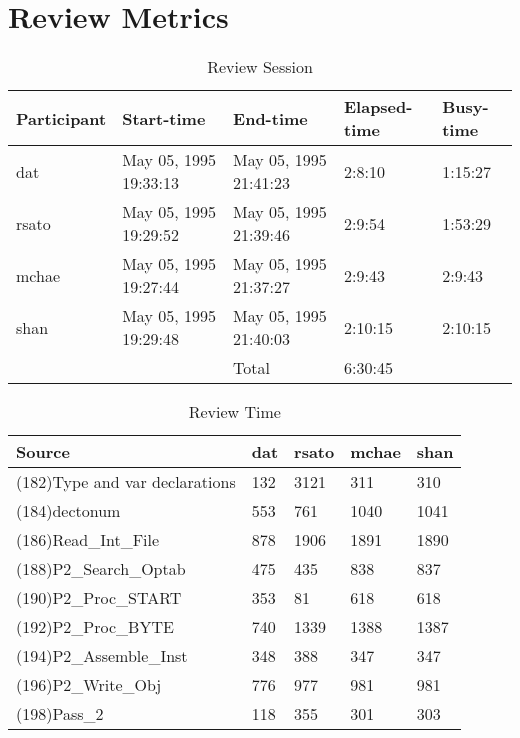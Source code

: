 \section{Review Metrics}
\begin{table}[hb]
\begin{center}
\begin{tabular}{|l|l|l|l|l|}
\hline
Participant & Start-time & End-time & Elapsed-time & Busy-time \\
\hline
dat & May 05, 1995 19:33:13 & May 05, 1995 21:41:23 & 2:8:10 & 1:15:27 \\
rsato & May 05, 1995 19:29:52 & May 05, 1995 21:39:46 & 2:9:54 & 1:53:29 \\
mchae & May 05, 1995 19:27:44 & May 05, 1995 21:37:27 & 2:9:43 & 2:9:43 \\
shan & May 05, 1995 19:29:48 & May 05, 1995 21:40:03 & 2:10:15 & 2:10:15 \\
\hline
 & & Total & 6:30:45 & \\
\hline
\end{tabular}
\end{center}
\caption{Review Session}
\end{table}


\begin{table}[hb]
\begin{center}
\begin{tabular}{|l|l|l|l|l|}
\hline
Source & dat & rsato & mchae & shan\\
\hline
(182)Type and var declarations & 132 & 3121 & 311 & 310\\
(184)dectonum & 553 & 761 & 1040 & 1041\\
(186)Read\_Int\_File & 878 & 1906 & 1891 & 1890\\
(188)P2\_Search\_Optab & 475 & 435 & 838 & 837\\
(190)P2\_Proc\_START & 353 & 81 & 618 & 618\\
(192)P2\_Proc\_BYTE & 740 & 1339 & 1388 & 1387\\
(194)P2\_Assemble\_Inst & 348 & 388 & 347 & 347\\
(196)P2\_Write\_Obj & 776 & 977 & 981 & 981\\
(198)Pass\_2 & 118 & 355 & 301 & 303\\
\hline
\end{tabular}
\end{center}
\caption{Review Time}
\end{table}

